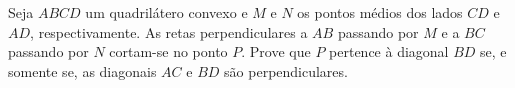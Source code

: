 Seja $ABCD$ um quadrilátero convexo e $M$ e $N$ os pontos médios dos lados $CD$ e $AD$, respectivamente.
As retas perpendiculares a $AB$ passando por $M$ e a $BC$ passando por $N$ cortam-se no ponto $P$.
Prove que $P$ pertence à diagonal $BD$ se, e somente se, as diagonais $AC$ e $BD$ são perpendiculares.